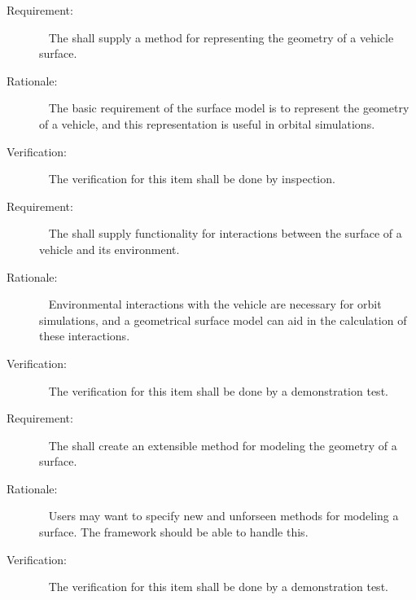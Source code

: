 \label{reqt:surfacemodel_geom_modeling}
\begin{description}
\item[Requirement:]\ \newline
The \ModelDesc shall supply a method for representing the geometry
of a vehicle surface.
\item[Rationale:]\ \newline
The basic requirement of the surface model is to represent the geometry
of a vehicle, and this representation is useful in orbital simulations.
\item[Verification:]\ \newline
The verification for this item shall be done by inspection.
\end{description}

 \label{reqt:surfacemodel_inter_modeling}
 \begin{description}
 \item[Requirement:]\ \newline
 The \ModelDesc shall supply functionality for interactions
 between the surface of a vehicle and its environment.
 \item[Rationale:]\ \newline
 Environmental interactions with the vehicle are necessary for orbit
 simulations, and a geometrical surface model can aid in the calculation
 of these interactions.
 \item[Verification:]\ \newline
 The verification for this item shall be done by a demonstration test.
 \end{description}

 \label{reqt:surfacemodel_exten_geom_modeling}
 \begin{description}
 \item[Requirement:]\ \newline
 The \ModelDesc shall create an extensible method for modeling
 the geometry of a surface.
 \item[Rationale:]\ \newline
 Users may want to specify new and unforseen methods for modeling a surface.
 The framework should be able to handle this.
 \item[Verification:]\ \newline
 The verification for this item shall be done by a demonstration test.
 \end{description}

